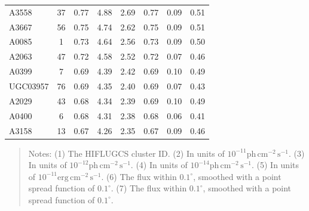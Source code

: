 \documentclass[10pt,aps,pra,reprint,amsmath,amsfonts,amssymb,showpacs,nofootinbib,floatfix]{revtex4-1}
\newcommand{\rmn}{\mathrm}
\begin{document}
\begin{table}
\begin{minipage}{2.0\columnwidth}
\begin{tabular}{l  c c c c c c c}
A3558    &  37 &   0.77 &   4.88 &   2.69 &   0.77 &   0.09 &   0.51 \\
A3667    &  56 &   0.75 &   4.74 &   2.62 &   0.75 &   0.09 &   0.51 \\
A0085    &   1 &   0.73 &   4.64 &   2.56 &   0.73 &   0.09 &   0.50 \\
A2063    &  47 &   0.72 &   4.58 &   2.52 &   0.72 &   0.07 &   0.46 \\
A0399    &   7 &   0.69 &   4.39 &   2.42 &   0.69 &   0.10 &   0.49 \\
UGC03957 &  76 &   0.69 &   4.35 &   2.40 &   0.69 &   0.07 &   0.43 \\
A2029    &  43 &   0.68 &   4.34 &   2.39 &   0.69 &   0.10 &   0.49 \\
A0400    &   6 &   0.68 &   4.31 &   2.38 &   0.68 &   0.06 &   0.41 \\
A3158    &  13 &   0.67 &   4.26 &   2.35 &   0.67 &   0.09 &   0.46 \\
\hline
\hline
\end{tabular}
\begin{quote}
  Notes: 
   (1) The HIFLUGCS cluster ID.
   (2) In units of  $10^{-11} \rmn{ph}\,\rmn{cm}^{-2}\,\rmn{s}^{-1}$.
   (3) In units of  $10^{-12} \rmn{ph}\,\rmn{cm}^{-2}\,\rmn{s}^{-1}$.
   (4) In units of  $10^{-14} \rmn{ph}\,\rmn{cm}^{-2}\,\rmn{s}^{-1}$.
   (5) In units of  $10^{-11} \rmn{erg}\,\rmn{cm}^{-2}\,\rmn{s}^{-1}$.
   (6) The flux within $0.1^\circ$, smoothed with a point spread function of $0.1^\circ$. 
   (7) The flux within $0.1^\circ$, smoothed with a point spread function of $0.1^\circ$. 
  \label{tab:flux_tab_BM}
  \end{quote}
\end{minipage}
\end{table} 
\end{document}
